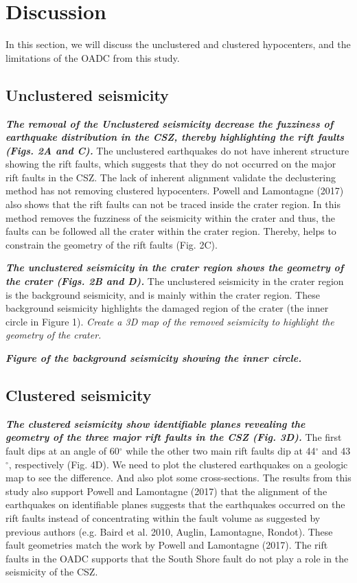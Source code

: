 \documentclass[draft]{agujournal2018}
\begin{document}
\section{Discussion}
In this section, we will discuss the unclustered and clustered hypocenters, and the limitations of the OADC from this study.

\subsection{Unclustered seismicity}
\textit{\textbf{The removal of the Unclustered seismicity decrease the fuzziness of earthquake distribution in the CSZ, thereby highlighting the rift faults (Figs. 2A and C).}} The unclustered earthquakes do not have inherent structure showing the rift faults, which suggests that they do not occurred on the major rift faults in the CSZ. The lack of inherent alignment validate the declustering method has not removing clustered hypocenters. Powell and Lamontagne (2017) also shows that the rift faults can not be traced inside the crater region. In this method removes the fuzziness of the seismicity within the crater and thus, the faults can be followed all the crater within the crater region. Thereby, helps to constrain the geometry of the rift faults (Fig. 2C).

\textit{\textbf{The unclustered seismicity in the crater region shows the geometry of the crater (Figs. 2B and D).}} The unclustered seismicity in the crater region is the background seismicity, and is mainly within the crater region. These background seismicity highlights the damaged region of the crater (the inner circle in Figure 1). \textit{Create a 3D map of the removed seismicity to highlight the geometry of the crater.}

\textbf{\textit{Figure of the background seismicity showing the inner circle.}}
 



\subsection{Clustered seismicity}
\textit{\textbf{The clustered seismicity show identifiable planes revealing the geometry of the three major rift faults in the CSZ (Fig. 3D).}} The first fault dips at an angle of 60$^\circ$ while the other two main rift faults dip at 44$^\circ$ and 43$^\circ$, respectively (Fig. 4D). We need to plot the clustered earthquakes on a geologic map to see the difference. And also plot some cross-sections. The results from this study also support Powell and Lamontagne (2017) that the alignment of the earthquakes on identifiable planes suggests that the earthquakes occurred on the rift faults instead of concentrating within the fault volume as suggested by previous authors (e.g. Baird et al. 2010, Auglin, Lamontagne, Rondot). These fault geometries match the work by Powell and Lamontagne (2017). The rift faults in the OADC supports that the South Shore fault do not play a role in the seismicity of the CSZ.
\end{document}
